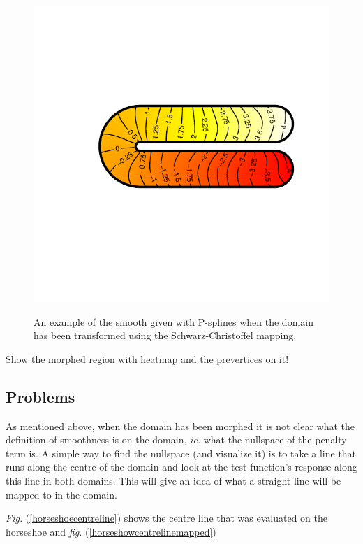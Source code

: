 \documentclass[a4paper,10pt]{amsart}
\newcommand{\sch}{Schwarz-Christoffel }
\newcommand{\fig}[1]{\emph{fig.} (\ref{#1})}
\newcommand{\Fig}[1]{\emph{Fig.} (\ref{#1})}
\begin{document}
\begin{figure}
\centering
\includegraphics[trim=0in 1.5in 0in 1.5in]{figs/examplescsmooth.pdf} \\
\caption{An example of the smooth given with P-splines when the domain has been transformed using the \sch mapping.}
\label{examplescsmooth}
\end{figure}




Show the morphed region with heatmap and the prevertices on it!



\subsection{Problems}

As mentioned above, when the domain has been morphed it is not clear what the definition of smoothness is on the domain, \emph{ie.} what the nullspace of the penalty term is. A simple way to find the nullspace (and visualize it) is to take a line that runs along the centre of the domain and look at the test function's response along this line in both domains. This will give an idea of what a straight line will be mapped to in the domain.

\Fig{horseshoecentreline} shows the centre line that was evaluated on the horseshoe and \fig{horseshowcentrelinemapped}
\end{document}
